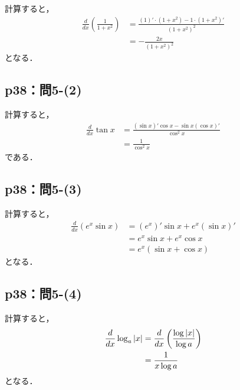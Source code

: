 \documentclass[uplatex,dvipdfmx,a4paper,10pt,fleqn]{jsarticle}
\newenvironment{tleftbar}{\begin{tbleftline}\setlength{\parindent}{1zw}}{\end{tbleftline}}
\begin{document}
\begin{tleftbar}
    計算すると，
    \begin{align*} 
        \frac{d}{dx} \left ( \frac{1}{1+x^2} \right) & = \frac{(1)' \cdot (1+x^2) - 1 \cdot (1+x^2)'}{(1+x^2)^2} \\
        & = -\frac{2x}{(1+x^2)^2} 
    \end{align*} 
    となる．
\end{tleftbar}


\subsection*{p38：問5-(2)}

\begin{tleftbar}
    計算すると，
    \begin{align*} 
        \frac{d}{dx} \tan x & = \frac{(\sin x)' \cos x - \sin x (\cos x)'}{\cos ^2 x} \\
        & = \frac{1}{\cos ^2 x}
    \end{align*}
        である．
\end{tleftbar}


\subsection*{p38：問5-(3)}

\begin{tleftbar}
    計算すると，
    \begin{align*} 
        \frac{d}{dx} ( e^x \sin x) & = (e^x)' \sin  x + e^x (\sin x)' \\
        & = e^x \sin x + e^x \cos x \\
        & = e^x (\sin x + \cos x)
    \end{align*} 
    となる．
\end{tleftbar}


\subsection*{p38：問5-(4)}

\begin{tleftbar}
    計算すると，
    \begin{align*} 
        \frac{d}{dx} \log_a \abs{x} & = \frac{d}{dx} \left ( \frac{\log \abs{x}}{\log a} \right) \\
        & = \frac{1}{x \log a}
    \end{align*}
    となる．
\end{tleftbar}
\end{document}
